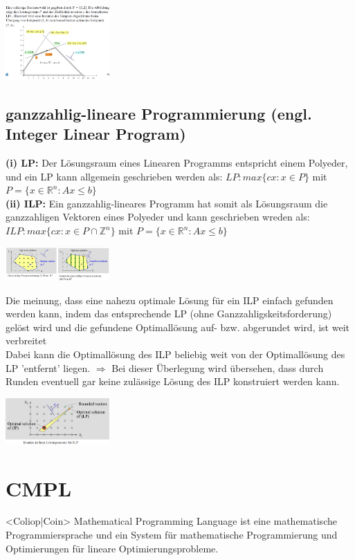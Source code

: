 \documentclass{report}
\newenvironment{Figure}
	{\par\medskip\noindent\minipage{\linewidth}}
	{\endminipage\par\medskip}
\theoremstyle{definition}
\theoremstyle{example}
\begin{document}
\begin{Figure}
\centering
\includegraphics[width=150px]{img/BspSimplexAlgorithmusII.png}
	\label{fig:Beispiel zum Simplex-Algorithmus II}
\end{Figure}

   \subsection{ganzzahlig-lineare Programmierung (engl. Integer Linear Program)}

\textbf{(i) LP:} Der Lösungsraum eines Linearen Programms entspricht einem Polyeder, und ein LP kann allgemein geschrieben werden als: $LP: max\{cx: x \in P\}$ mit $P = \{ x \in \mathbb{R}^n: Ax \leq b \}$\\
\textbf{(ii) ILP:} Ein ganzzahlig-lineares Programm hat somit als Lösungsraum die ganzzahligen Vektoren eines Polyeder und kann geschrieben wreden als: $ILP: max\{cx: x \in P \cap \mathbb{Z}^n \} $ mit $P = \{ x \in \mathbb{R}^n: Ax \leq b \}$
\begin{Figure}
\centering
\includegraphics[width=150px]{img/ILP.png}
	\label{fig:ILP}
\end{Figure}

Die meinung, dass eine nahezu optimale Lösung für ein ILP einfach gefunden werden kann, indem das entsprechende LP (ohne Ganzzahligskeitsforderung) gelöst wird und die gefundene Optimallösung auf- bzw. abgerundet wird, ist weit verbreitet\\
Dabei kann die Optimallösung des ILP beliebig weit von der Optimallösung des LP 'entfernt' liegen.
$\Rightarrow$ Bei dieser Überlegung wird übersehen, dass durch Runden eventuell gar keine zulässige Lösung des ILP konstruiert werden kann.\\
\begin{Figure}
\centering
\includegraphics[width=150px]{img/ILPII.png}
	\label{fig:ILP II}
\end{Figure}


\section{CMPL}
<Coliop|Coin> Mathematical Programming Language ist eine mathematische Programmiersprache und ein System für mathematische Programmierung und Optimierungen für lineare Optimierungsprobleme.
\end{document}
